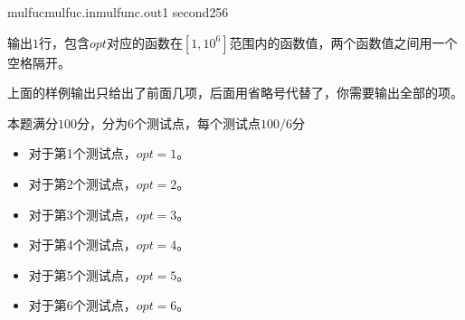 \documentclass[11pt,a4paper,oneside]{article}
\begin{document}
\begin{problem}{mulfuc}{mulfuc.in}{mulfunc.out}{1 second}{256}
	\OutputFile
	
	输出$1$行，包含$opt$对应的函数在$[1,10^6]$范围内的函数值，两个函数值之间用一个空格隔开。
	
	\Example
	
	\begin{example}
\end{example}

\begin{example}
\end{example}

\begin{example}
\end{example}

\begin{example}
\end{example}

\Note

上面的样例输出只给出了前面几项，后面用省略号代替了，你需要输出全部的项。

本题满分$100$分，分为$6$个测试点，每个测试点$100/6$分

\begin{itemize}
	\item 对于第1个测试点，$opt = 1$。
	\item 对于第2个测试点，$opt = 2$。
	\item 对于第3个测试点，$opt = 3$。
	\item 对于第4个测试点，$opt = 4$。
	\item 对于第5个测试点，$opt = 5$。
	\item 对于第6个测试点，$opt = 6$。
\end{itemize}

\end{problem}
\end{document}
